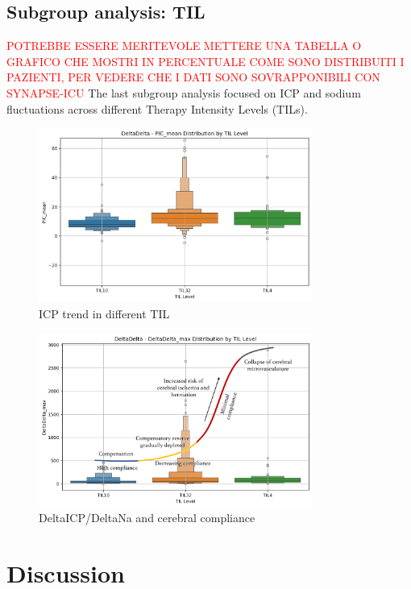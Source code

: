 \subsection{Subgroup analysis: TIL}
\textcolor{red}{POTREBBE ESSERE MERITEVOLE METTERE UNA TABELLA O GRAFICO CHE MOSTRI IN PERCENTUALE COME SONO DISTRIBUITI I PAZIENTI, PER VEDERE CHE I DATI SONO SOVRAPPONIBILI CON SYNAPSE-ICU}
The last subgroup analysis focused on ICP and sodium fluctuations across different Therapy Intensity Levels (TILs). 

\begin{figure}[h!]
    \centering
    \includegraphics[width=0.8\textwidth]{pictures/fig12_ICPTIL.png}
    \caption{ICP trend in different TIL} %
    \label{fig:ICPTIL} %
\end{figure}

\begin{figure}[h!]
    \centering
    \includegraphics[width=0.8\textwidth]{pictures/fig13_DDTIL.png}
    \caption{DeltaICP/DeltaNa and cerebral compliance} %
    \label{fig:DDTIL} %
\end{figure}


\section{Discussion}


